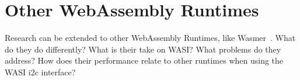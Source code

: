 \section*{Other WebAssembly Runtimes}

Research can be extended to other WebAssembly Runtimes, like Wasmer~\cite{wasmer_git}. What do they do differently? What is their take on WASI? What problems do they address? How does their performance relate to other runtimes when using the WASI \acrshort{i2c} interface?










































